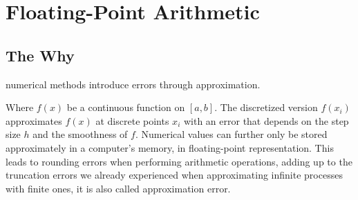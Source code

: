 \chapter{Floating-Point Arithmetic}







\section{The Why}


 numerical methods introduce errors through approximation. 

Where $f(x)$ be a continuous function on $[a, b]$. The discretized version $f(x_i)$ approximates $f(x)$ at discrete points $x_i$ with an error that
depends on the step size $h$ and the smoothness of $f$. 
Numerical values can further only be stored approximately in a computer's memory, in floating-point representation.
This leads to rounding errors when performing arithmetic operations, adding up to the truncation errors we already experienced when approximating infinite processes with finite ones, it is also called approximation error.

